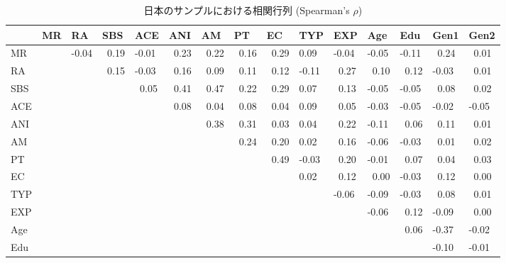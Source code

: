\documentclass[a4j,12pt]{jreport}
\begin{document}
\begin{table}[H]
{\scriptsize
  \begin{threeparttable}
\caption{日本のサンプルにおける相関行列 (Spearman's $\rho$) }
\label{tab:Table_Cor_JP}
\begin{tabular}{@{}lllllllllllllll@{}}
\toprule
     & MR & RA    & SBS        & ACE        & ANI        & AM         & PT         & EC         & TYP   & EXP        & Age        & Edu        & Gen1       & Gen2        \\ \midrule
MR   &    & -0.04 & ~0.19 & -0.01      & ~0.23 & ~0.22 & ~0.16 & ~0.29 & 0.09  & -0.04      & -0.05      & -0.11      & ~0.24 & ~0.01  \\
RA   &    &       & ~0.15 & -0.03      & ~0.16 & ~0.09 & ~0.11 & ~0.12 & -0.11 & ~0.27 & ~0.10 & ~0.12 & -0.03      & ~0.01  \\
SBS  &    &       &            & ~0.05 & ~0.41 & ~0.47 & ~0.22 & ~0.29 & 0.07  & ~0.13 & -0.05      & -0.05      & ~0.08 & ~0.02  \\
ACE  &    &       &            &            & ~0.08 & ~0.04 & ~0.08 & ~0.04 & 0.09  & ~0.05 & -0.03      & -0.05      & -0.02      & -0.05 \\
ANI  &    &       &            &            &            & ~0.38 & ~0.31 & ~0.03 & 0.04  & ~0.22 & -0.11      & ~0.06 & ~0.11 & ~0.01  \\
AM   &    &       &            &            &            &            & ~0.24 & ~0.20 & 0.02  & ~0.16 & -0.06      & -0.03      & ~0.01 & ~0.02  \\
PT   &    &       &            &            &            &            &            & ~0.49 & -0.03 & ~0.20 & -0.01      & ~0.07 & ~0.04 & ~0.03  \\
EC   &    &       &            &            &            &            &            &            & 0.02  & ~0.12 & ~0.00 & -0.03      & ~0.12 & ~0.00  \\
TYP  &    &       &            &            &            &            &            &            &       & -0.06      & -0.09      & -0.03      & ~0.08 & ~0.01  \\
EXP  &    &       &            &            &            &            &            &            &       &            & -0.06      & ~0.12 & -0.09      & ~0.00  \\
Age  &    &       &            &            &            &            &            &            &       &            &            & ~0.06 & -0.37      & -0.02       \\
Edu  &    &       &            &            &            &            &            &            &       &            &            &            & -0.10      & -0.01       \\

\end{tabular}
\end{threeparttable}}
\end{table}
\end{document}
